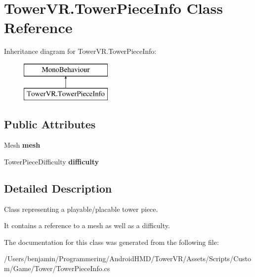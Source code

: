 \hypertarget{class_tower_v_r_1_1_tower_piece_info}{}\section{Tower\+V\+R.\+Tower\+Piece\+Info Class Reference}
\label{class_tower_v_r_1_1_tower_piece_info}
Inheritance diagram for Tower\+V\+R.\+Tower\+Piece\+Info\+:\begin{figure}[H]
\begin{center}
\leavevmode
\includegraphics[height=2.000000cm]{class_tower_v_r_1_1_tower_piece_info}
\end{center}
\end{figure}
\subsection*{Public Attributes}
\begin{DoxyCompactItemize}
\item 
Mesh {\bfseries mesh}\hypertarget{class_tower_v_r_1_1_tower_piece_info_a9a51d7505e2ab6497753a04fc5d0bda8}{}\label{class_tower_v_r_1_1_tower_piece_info_a9a51d7505e2ab6497753a04fc5d0bda8}

\item 
Tower\+Piece\+Difficulty {\bfseries difficulty}\hypertarget{class_tower_v_r_1_1_tower_piece_info_a0c14a859f276fa25a4c179b1760285bd}{}\label{class_tower_v_r_1_1_tower_piece_info_a0c14a859f276fa25a4c179b1760285bd}

\end{DoxyCompactItemize}


\subsection{Detailed Description}
Class representing a playable/placable tower piece.

It contains a reference to a mesh as well as a difficulty. 

The documentation for this class was generated from the following file\+:\begin{DoxyCompactItemize}
\item 
/\+Users/benjamin/\+Programmering/\+Android\+H\+M\+D/\+Tower\+V\+R/\+Assets/\+Scripts/\+Custom/\+Game/\+Tower/Tower\+Piece\+Info.\+cs\end{DoxyCompactItemize}
